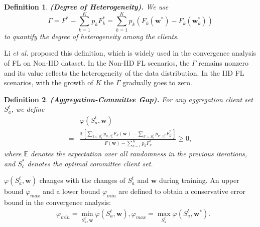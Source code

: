 \documentclass[10pt,journal,compsoc]{IEEEtran}
\newtheorem{definition}{Definition}
\newcommand{\etal}{\emph{et al.} }
\newcommand{\w}{\mathbf{w}}
\begin{document}



\begin{definition}\label{heterogeneity}
\textbf{(Degree of Heterogeneity).} \textit{We use 
\begin{equation}
\Gamma = F^* - \sum_{k=1}^Kp_kF_k^* = \sum_{k=1}^Kp_k(F_k(\w^*)-F_k(\w_k^*))
\end{equation}
to quantify the degree of heterogeneity among the clients.}
\end{definition}
Li \etal \cite{li2020convergence} proposed this definition, which is widely used in the convergence analysis of FL on Non-IID dataset\cite{9337227}. In the Non-IID FL scenarios, the $\Gamma$ remains nonzero and its value reflects the heterogeneity of the data distribution. In the IID FL scenarios, with the growth of $K$ the $\Gamma$ gradually goes to zero.

\begin{definition}\label{CommitteeSkew}
\textbf{(Aggregation-Committee Gap).} \textit{For any aggregation client set $S_a^t$, we define  
\begin{equation}
\begin{split}
&\varphi(S_a^{t},\w) \\
=& \frac{\mathbb{E}[\sum_{k \in S^{t}_a}p_{k,S_a^t}F_k(\w)-\sum_{k' \in S_c^*}p_{k',S_c^*}F_{k'}^*]}{F(\w) - \sum_{k=1}^Kp_kF_k^*} \geq 0,
\end{split}
\end{equation}
where $\mathbb{E}$ denotes the expectation over all randomness in the previous iterations, and $S_c^*$ denotes the optimal committee client set.}
\end{definition}
$\varphi(S_a^t,\w)$ changes with the changes of $S_a^t$ and $\w$ during training. An upper bound $\varphi_{max}$ and a lower bound $\varphi_{min}$ are defined to obtain a conservative error bound in the convergence analysis:
\begin{equation}
\begin{split}
&\varphi_{min} = \min_{S_a^t,\w}\varphi(S_a^t,\w),\varphi_{max} = \max_{S_a^t}\varphi(S_a^t,\w^*).
\end{split}
\end{equation}
\end{document}

